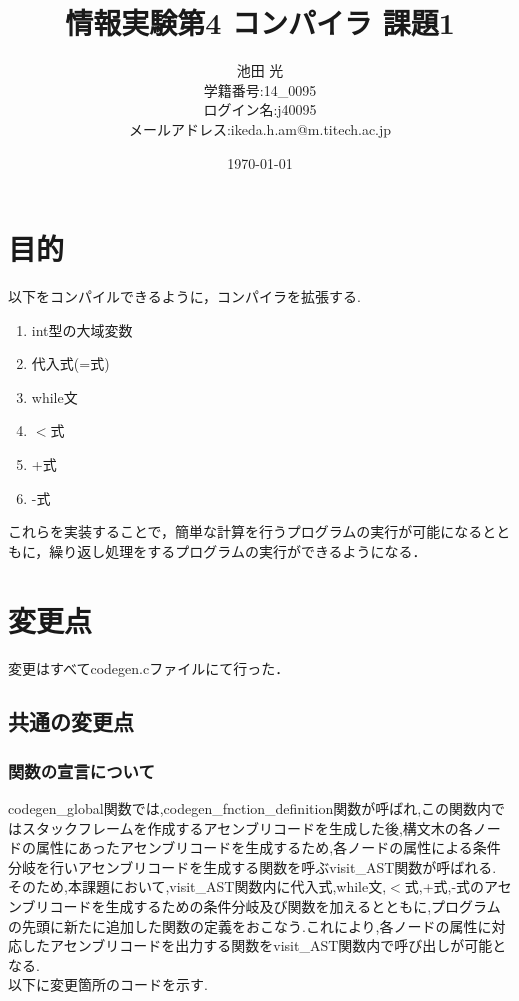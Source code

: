 \documentclass[10pt]{jsarticle}
\begin{document}
\begin{titlepage}
\title{情報実験第4 コンパイラ 課題1}
\date{\today}
\author{池田 光 \\ 学籍番号:14\_0095 \\ ログイン名:j40095 \\ メールアドレス:ikeda.h.am@m.titech.ac.jp}
\maketitle
\thispagestyle{empty}
\end{titlepage}


\section{目的}
以下をコンパイルできるように，コンパイラを拡張する.
\begin{enumerate}
\item int型の大域変数
\item 代入式(=式)
\item while文
\item $<$式
\item +式
\item -式
\end{enumerate}
これらを実装することで，簡単な計算を行うプログラムの実行が可能になるとともに，繰り返し処理をするプログラムの実行ができるようになる．
\section{変更点}
変更はすべてcodegen.cファイルにて行った．

\subsection{共通の変更点}
\subsubsection{関数の宣言について}
codegen\_global関数では,codegen\_fnction\_definition関数が呼ばれ,この関数内ではスタックフレームを作成するアセンブリコードを生成した後,構文木の各ノードの属性にあったアセンブリコードを生成するため,各ノードの属性による条件分岐を行いアセンブリコードを生成する関数を呼ぶvisit\_AST関数が呼ばれる.
そのため,本課題において,visit\_AST関数内に代入式,while文,$<$式,+式,-式のアセンブリコードを生成するための条件分岐及び関数を加えるとともに,プログラムの先頭に新たに追加した関数の定義をおこなう.これにより,各ノードの属性に対応したアセンブリコードを出力する関数をvisit\_AST関数内で呼び出しが可能となる.\\
以下に変更箇所のコードを示す.
\end{document}
